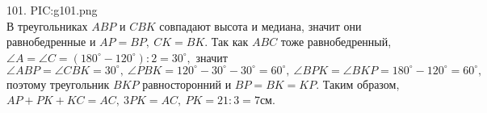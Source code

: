 101. {{PIC:g101.png}}\\
В треугольниках $ABP$ и $CBK$ совпадают высота и медиана, значит они равнобедренные и $AP=BP,\ CK=BK.$ Так как $ABC$ тоже равнобедренный, $\angle A=\angle C=(180^\circ-120^\circ):2=30^\circ,$ значит $\angle ABP=\angle CBK=30^\circ,\ \angle PBK=120^\circ-30^\circ-30^\circ=60^\circ,\ \angle BPK=\angle BKP=180^\circ-120^\circ=60^\circ,$ поэтому треугольник $BKP$ равносторонний и $BP=BK=KP.$ Таким образом, $AP+PK+KC=AC,\ 3PK=AC,\ PK=21:3=7$см.\\
